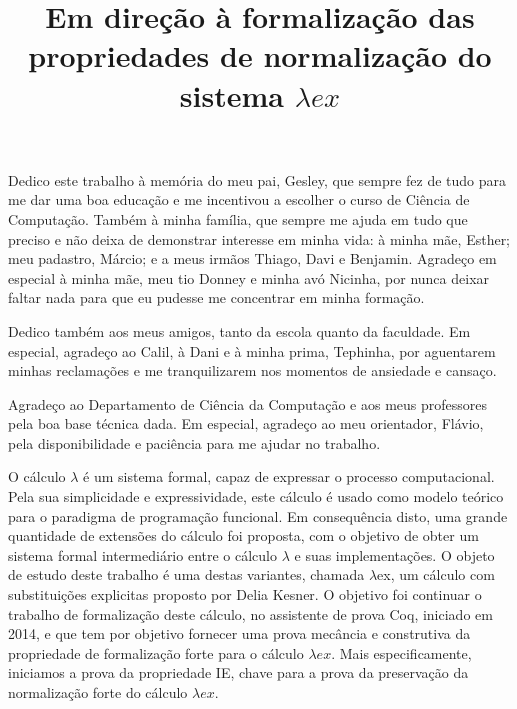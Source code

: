\documentclass[bacharelado]{unb-cic}
\title{Em direção à formalização das propriedades de normalização do sistema
    $\lambda ex$}%
\begin{document}
  \maketitle
  \pretextual

  \begin{dedicatoria}
      Dedico este trabalho à memória do meu pai, Gesley, que sempre fez de tudo
      para me dar uma boa educação e me incentivou a escolher o curso de Ciência
      de Computação. Também à minha família, que sempre me ajuda em tudo que
      preciso e não deixa de demonstrar interesse em minha vida: à minha
      mãe, Esther; meu padastro, Márcio; e a meus irmãos Thiago, Davi e
      Benjamin. Agradeço em especial à minha mãe, meu tio Donney e minha avó
      Nicinha, por nunca deixar faltar nada para que eu pudesse me concentrar em
      minha formação.

      Dedico também aos meus amigos, tanto da escola quanto da faculdade. Em
      especial, agradeço ao Calil, à Dani e à minha prima, Tephinha, por
      aguentarem minhas reclamações e me tranquilizarem nos momentos de
      ansiedade e cansaço.
  \end{dedicatoria}

  \begin{agradecimentos}
      Agradeço ao Departamento de Ciência da Computação e aos meus professores
      pela boa base técnica dada. Em especial, agradeço ao meu orientador,
      Flávio, pela disponibilidade e paciência para me ajudar no trabalho.
  \end{agradecimentos}

  \begin{resumo}
    O cálculo $\lambda$ é um sistema formal, capaz de expressar o processo
    computacional.  Pela sua simplicidade e expressividade, este cálculo é usado
    como modelo teórico para o paradigma de programação funcional. Em consequência
    disto, uma grande quantidade de extensões do cálculo foi proposta, com o
    objetivo de obter um sistema formal intermediário entre o cálculo $\lambda$ e suas
    implementações.  O objeto de estudo deste trabalho é uma destas variantes,
    chamada $\lambda$ex, um cálculo com substituições explicitas proposto por Delia
    Kesner. O objetivo foi continuar o trabalho de formalização deste cálculo, no
    assistente de prova Coq, iniciado em 2014, e que tem por objetivo fornecer
    uma prova mecância e construtiva da propriedade de formalização forte para o
    cálculo $\lambda ex$. Mais especificamente, iniciamos a prova da
    propriedade IE, chave para a prova da preservação da normalização forte do
    cálculo $\lambda ex$.
    \end{resumo}
\end{document}
